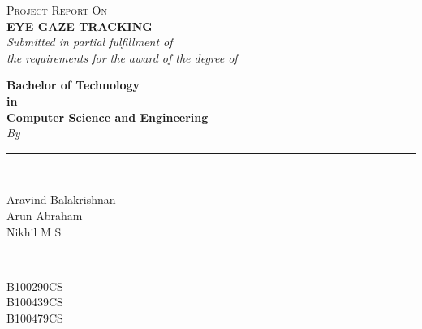 \begin{titlepage}

\newcommand{\HRule}{\rule{\linewidth}{0.5mm}} %

\center %
 
\textsc{\large Project Report On }\\[0.5cm] %



{\Large  \bfseries EYE GAZE TRACKING
}\\[0.8cm] %

\small \emph{Submitted in partial fulfillment of\\
        the requirements for the award of the degree of}
        \vspace{.2in}

       {\bf Bachelor of Technology \\in\\ Computer Science and Engineering}\\[0.2in]

 
\textit{By}

\HRule \\[.2cm]
\begin{minipage}{0.4\textwidth}
\begin{flushleft} \large
Aravind Balakrishnan\\
Arun Abraham\\
Nikhil M S
\end{flushleft}
\end{minipage}
~
\begin{minipage}{0.4\textwidth}
\begin{flushright} \large
B100290CS\\
B100439CS\\
B100479CS\\
\end{flushright}
\end{minipage}\\[.5cm]


\end{titlepage}
